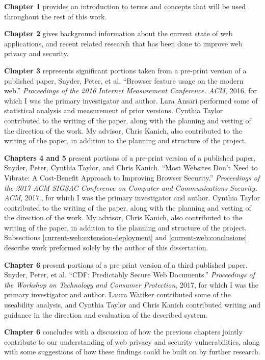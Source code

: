 \authorcontributions

\textbf{Chapter 1} provides an introduction to terms and concepts that will
be used throughout the rest of this work.

\textbf{Chapter 2} gives background
information about the current state of web applications, and recent related
research that has been done to improve web privacy and security.

\textbf{Chapter 3} represents significant portions taken from a pre-print
version of a published paper, Snyder, Peter, et al. ``Browser feature
usage on the modern web.'' \textit{Proceedings of the 2016 Internet Measurement
Conference. ACM}, 2016, for which I was the primary investigator and author.
Lara Ansari performed some of statistical analysis and measurement of prior
\FF versions.  Cynthia Taylor contributed to the writing of the paper, along
with the planning and vetting of the direction of the work.  My advisor,
Chris Kanich, also contributed to the writing of the paper, in addition to the
planning and structure of the project.

\textbf{Chapters 4 and 5} present portions of a pre-print version of a
published paper, Snyder, Peter,
Cynthia Taylor, and Chris Kanich. ``Most Websites Don't Need to Vibrate: A
Cost-Benefit Approach to Improving Browser Security.'' \textit{Proceedings of the 2017
ACM SIGSAC Conference on Computer and Communications Security. ACM}, 2017.,
for which I was the primary investigator and author.  Cynthia Taylor contributed
to the writing of the paper, along with the planning and vetting of the
direction of the work.  My advisor, Chris Kanich, also contributed to the
writing of the paper, in addition to the planning and structure of the project.
Subsections \ref{current-web:extension-deployment} and
\ref{current-web:conclusions} describe work preformed solely by the author of
this dissertation.

\textbf{Chapter 6} present portions of a pre-print version of a third
published paper, Snyder, Peter, et al. ``CDF: Predictably Secure Web
Documents.'' \textit{Proceedings of the Workshop on Technology and Consumer
Protection}, 2017, for which I was the primary investigator and author.  Laura Watiker contributed
some of the useability analysis, and Cynthia Taylor and Chris Kanich
contributed writing and guidance in the direction and evaluation of the described
system.

\textbf{Chapter 6} concludes with a discussion of how the previous chapters
jointly contribute to our understanding of web privacy and security
vulnerabilities, along with some suggestions of how these findings could
be built on by further research.